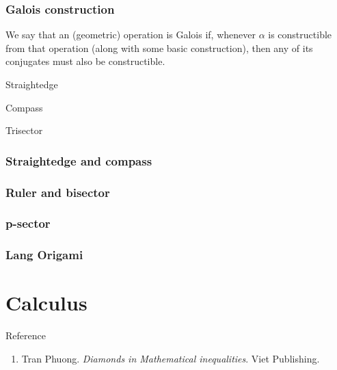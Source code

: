 \documentclass{treatise}
\begin{document}
\begin{shaded}
\subsection{Galois construction}
We say that an (geometric) operation is Galois if, whenever $\alpha$ is constructible from that operation (along with some basic construction), then any of its conjugates must also be constructible.
\begin{example}
	\item Straightedge
	\item Compass
	\item Trisector
\end{example}

\subsection{Straightedge and compass}
\subsection{Ruler and bisector}
\subsection{p-sector}
\subsection{Lang Origami}

\chapter{Calculus}
Reference
\begin{enumerate}
	\item Tran Phuong. \textit{Diamonds in Mathematical inequalities}. Viet Publishing.
\end{enumerate}


\end{shaded}
\end{document}
